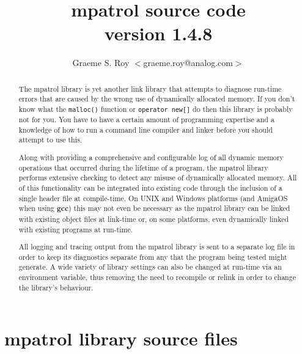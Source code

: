\documentclass[a4paper,final]{report}
\newcommand{\version}[0]{1.4.8}
\begin{document}
\title{\textbf{mpatrol source code} \\ version \version}

\author{Graeme S. Roy $<$graeme.roy@analog.com$>$}

\maketitle

\begin{abstract}
The mpatrol library is yet another link library that attempts to diagnose
run-time errors that are caused by the wrong use of dynamically allocated
memory.  If you don't know what the \texttt{malloc()} function or
\texttt{operator new[]} do then this library is probably not for you.  You
have to have a certain amount of programming expertise and a knowledge of
how to run a command line compiler and linker before you should attempt to
use this.

Along with providing a comprehensive and configurable log of all dynamic
memory operations that occurred during the lifetime of a program, the
mpatrol library performs extensive checking to detect any misuse of
dynamically allocated memory.  All of this functionality can be integrated
into existing code through the inclusion of a single header file at
compile-time.  On UNIX and Windows platforms (and AmigaOS when using
\textbf{gcc}) this may not even be necessary as the mpatrol library can be
linked with existing object files at link-time or, on some platforms, even
dynamically linked with existing programs at run-time.

All logging and tracing output from the mpatrol library is sent to a
separate log file in order to keep its diagnostics separate from any that
the program being tested might generate.  A wide variety of library settings
can also be changed at run-time via an environment variable, thus removing
the need to recompile or relink in order to change the library's behaviour.
\end{abstract}


\tableofcontents

\chapter{mpatrol library source files}


\pagestyle{myheadings}
\end{document}
